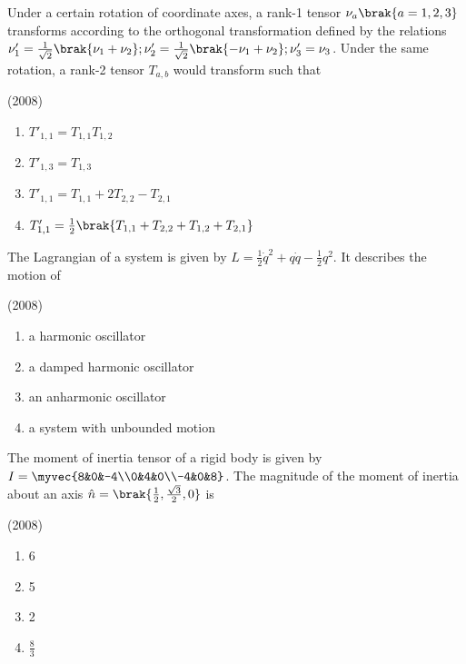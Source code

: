     \item Under a certain rotation of coordinate axes, a rank-1 tensor $\nu_a \brak{a=1,2,3}$ transforms according to the orthogonal transformation defined by the relations $\nu_1'=\frac{1}{\sqrt{2}}\brak{\nu_1+\nu_2};\nu_2'=\frac{1}{\sqrt{2}}\brak{-\nu_1+\nu_2};\nu_3'=\nu_3$. Under the same rotation, a rank-2 tensor $T_{a,b}$ would transform such that
    
    \hfill{(2008)}

        \begin{multicols}{2}
            \begin{enumerate}
                \item $T'_{1,1}=T_{1,1}T_{1,2}$
                \item $T'_{1,3}=T_{1,3}$
                \item $T'_{1,1}=T_{1,1}+2T_{2,2}-T_{2,1}$
                \item $T'_{1,1}=\frac{1}{2}\brak{T_{1,1}+T_{2,2}+T_{1,2}+T_{2,1}}$
            \end{enumerate}
        \end{multicols}

    \item The Lagrangian of a system is given by $L=\frac{1}{2}\dot{q}^2+q\dot{q}-\frac{1}{2}q^2$. It describes the motion of
    
    \hfill{(2008)}

        \begin{multicols}{2}
            \begin{enumerate}
                \item a harmonic oscillator
                \item a damped harmonic oscillator
                \item an anharmonic oscillator
                \item a system with unbounded motion
            \end{enumerate}
        \end{multicols}
        
    \item The moment of inertia tensor of a rigid body is given by $I=\myvec{8&0&-4\\0&4&0\\-4&0&8}$. The magnitude of the moment of inertia about an axis $\hat{n}=\brak{\frac{1}{2},\frac{\sqrt{3}}{2},0}$ is
    
    \hfill{(2008)}

        \begin{multicols}{4}
            \begin{enumerate}
                \item 6
                \item 5
                \item 2
                \item $\frac{8}{3}$
            \end{enumerate}
        \end{multicols}

